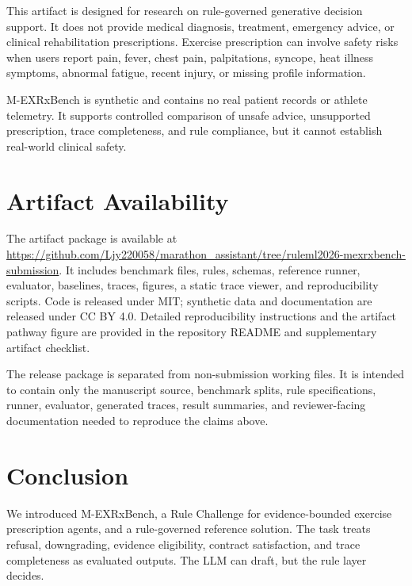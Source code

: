 \documentclass{ceurart}
\begin{document}
This artifact is designed for research on rule-governed generative decision support. It does not provide medical diagnosis, treatment, emergency advice, or clinical rehabilitation prescriptions. Exercise prescription can involve safety risks when users report pain, fever, chest pain, palpitations, syncope, heat illness symptoms, abnormal fatigue, recent injury, or missing profile information.

M-EXRxBench is synthetic and contains no real patient records or athlete telemetry. It supports controlled comparison of unsafe advice, unsupported prescription, trace completeness, and rule compliance, but it cannot establish real-world clinical safety.

\section{Artifact Availability}

The artifact package is available at
\url{https://github.com/Ljy220058/marathon_assistant/tree/ruleml2026-mexrxbench-submission}.
It includes benchmark
files, rules, schemas, reference runner, evaluator, baselines, traces, figures,
a static trace viewer, and reproducibility scripts. Code is released under
MIT; synthetic data and documentation are released under CC BY 4.0. Detailed reproducibility
instructions and the artifact pathway figure are provided in the repository
README and supplementary artifact checklist.

The release package is separated from non-submission working files. It is intended
to contain only the manuscript source, benchmark splits, rule specifications,
runner, evaluator, generated traces, result summaries, and reviewer-facing
documentation needed to reproduce the claims above.

\section{Conclusion}

We introduced M-EXRxBench, a Rule Challenge for evidence-bounded exercise prescription agents, and a rule-governed reference solution. The task treats refusal, downgrading, evidence eligibility, contract satisfaction, and trace completeness as evaluated outputs. The LLM can draft, but the rule layer decides.


\end{document}
